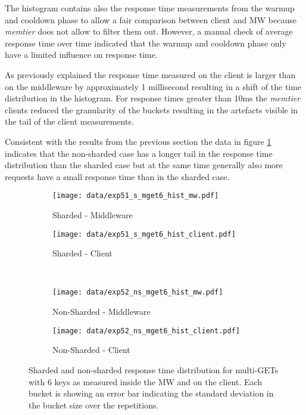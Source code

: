 \documentclass[report.tex]{subfiles}
\begin{document}
The histogram contains also the response time measurements from the warmup and cooldown phase to allow a fair comparison between client and MW because \emph{memtier} does not allow to filter them out. However, a manual check of average response time over time indicated that the warmup and cooldown phase only have a limited influence on response time.

As previously explained the response time measured on the client is larger than on the middleware by approximately 1 millisecond resulting in a shift of the time distribution in the histogram.
For response times greater than 10ms the \emph{memtier} clients reduced the granularity of the buckets resulting in the artefacts visible in the tail of the client measurements.

Consistent with the results from the previous section the data in figure \ref{exp5_hist} indicates that the non-sharded case has a longer tail in the response time distribution than the sharded case but at the same time generally also more requests have a small response time than in the sharded case.

\begin{figure}
	\begin{subfigure}[b]{.49\linewidth}
		\centering
		\texttt{[image: data/exp51\_s\_mget6\_hist\_mw.pdf]}
		\caption{Sharded - Middleware}
	\end{subfigure}\hfill
	\begin{subfigure}[b]{.49\linewidth}
		\centering
		\texttt{[image: data/exp51\_s\_mget6\_hist\_client.pdf]}
		\caption{Sharded - Client}
	\end{subfigure} \\
	\begin{subfigure}[b]{.49\linewidth}
		\centering
		\texttt{[image: data/exp52\_ns\_mget6\_hist\_mw.pdf]}
		\caption{Non-Sharded - Middleware}
	\end{subfigure}\hfill
	\begin{subfigure}[b]{.49\linewidth}
		\centering
		\texttt{[image: data/exp52\_ns\_mget6\_hist\_client.pdf]}
		\caption{Non-Sharded - Client}
	\end{subfigure}%
	\caption{Sharded and non-sharded response time distribution for multi-GETs with 6 keys as measured inside the MW and on the client. Each bucket is showing an error bar indicating the standard deviation in the bucket size over the repetitions.}\label{exp5_hist}
\end{figure}
\end{document}
